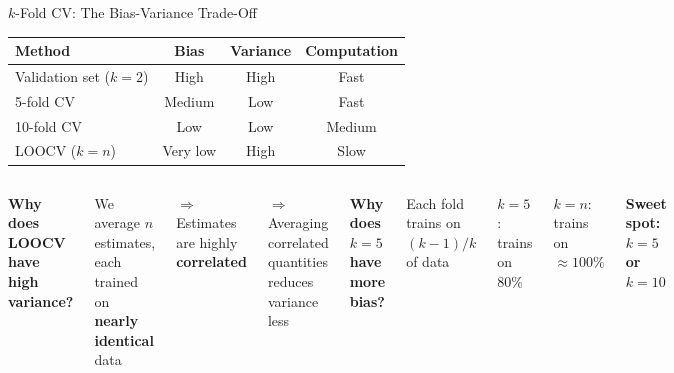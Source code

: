 \documentclass[aspectratio=169, 11pt]{beamer}
\begin{document}
\begin{frame}{$k$-Fold CV: The Bias-Variance Trade-Off}

\begin{center}
\begin{tabular}{lccc}
\toprule
Method & Bias & Variance & Computation \\
\midrule
Validation set ($k=2$) & \textcolor{softred}{High} & \textcolor{softred}{High} & \textcolor{softgreen}{Fast} \\
5-fold CV & Medium & \textcolor{softgreen}{Low} & \textcolor{softgreen}{Fast} \\
10-fold CV & Low & \textcolor{softgreen}{Low} & Medium \\
LOOCV ($k=n$) & \textcolor{softgreen}{Very low} & \textcolor{softred}{High} & \textcolor{softred}{Slow} \\
\bottomrule
\end{tabular}
\end{center}

\vspace{0.5em}
\begin{columns}
\textbf{Why does LOOCV have high variance?}

\vspace{0.2em}
We average $n$ estimates, each trained on \textbf{nearly identical} data

$\Rightarrow$ Estimates are highly \textbf{correlated}

$\Rightarrow$ Averaging correlated quantities reduces variance less

\textbf{Why does $k=5$ have more bias?}

\vspace{0.2em}
Each fold trains on $(k-1)/k$ of data

$k=5$: trains on 80\%

$k=n$: trains on $\approx 100\%$

\vspace{0.3em}
\textcolor{accent}{\textbf{Sweet spot: $k = 5$ or $k = 10$}}
\end{columns}
\end{frame}
\end{document}
